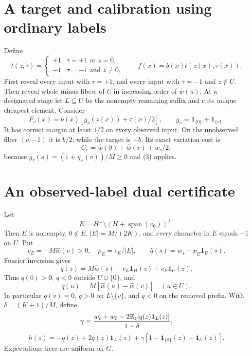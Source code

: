 \documentclass[11pt]{article}
\newcommand{\one}{\mathbf1}\newcommand{\relu}{\operatorname{ReLU}}
\begin{document}
\section{A target and calibration using ordinary labels}
Define
\[
 t(z,\tau)=
 \begin{cases}+1&\tau=+1\text{ or }z=0,\\
              -1&\tau=-1\text{ and }z\ne0,\end{cases}
 \qquad f(x)=b(x)t(z(x),\tau(x)).                         \tag{9}
\]
First reveal every input with $\tau=+1$, and every input with
$\tau=-1$ and $z\notin U$. Then reveal whole minus fibers of $U$ in
increasing order of $\widehat w(u)$. At a designated stage let
$L\subseteq U$ be the nonempty remaining suffix and $v$ its unique
cheapest element. Consider
\[
 F_v(x)=b(x)[g_v(z(x))+\tau(x)/2],\qquad
                         g_v=\one_{\{0\}}+\one_{\{v\}}.   \tag{10}
\]
It has correct margin at least $1/2$ on every observed input.
On the unobserved fiber $(v,-1)$ it is $b/2$, while the target is $-b$.
Its exact variation cost is
\[
                   C_v=\widehat w(0)+\widehat w(v)+w_c/2, \tag{11}
\]
because $\widehat g_v(s)=(1+\chi_s(v))/M\ge0$ and (3) applies.

\section{An observed-label dual certificate}\label{sec:control}
Let
\[
 E=H^\perp\setminus(H+\operatorname{span}(v_0))^\perp.
\]
Then $E$ is nonempty, $0\notin E$, $|E|=M/(2K)$, and every character
in $E$ equals $-1$ on $U$. Put
\[
 c_E=-M\widehat w(v)>0,\quad p_E=c_E/|E|,\qquad
                         \widehat q(s)=w_s-p_E\one_E(s).
\]
Fourier inversion gives
\[
 q(z)=M\widehat w(z)-c_E\one_H(z)+c_E\one_U(z).           \tag{12}
\]
Thus $q(0)>0$, $q<0$ outside $U\cup\{0\}$, and
\[
                  q(u)=M[\widehat w(u)-\widehat w(v)]
                                     \quad(u\in U).     \tag{13}
\]
In particular $q(v)=0$, $q>0$ on $L\setminus\{v\}$, and $q<0$
on the removed prefix. With $\delta=(K+1)/M$, define
\[
 \gamma=\frac{w_c+w_0-2\E_z[q(z)\one_L(z)]}{1-\delta},
\]
\[
 h(z)=-q(z)+2q(z)\one_L(z)
                  +\gamma[1-\one_{\{0\}}(z)-\one_U(z)]. \tag{14}
\]
Expectations here are uniform on $G$.
\end{document}
